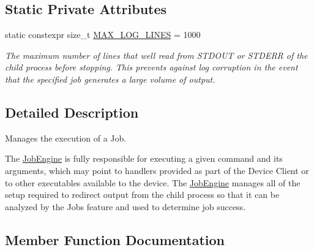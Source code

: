 \subsection*{Static Private Attributes}
\begin{DoxyCompactItemize}
\item 
\mbox{\label{class_aws_1_1_iot_1_1_device_client_1_1_jobs_1_1_job_engine_a333eb4a7c9d0ec7143e2b954ee5a1be3}} 
static constexpr size\+\_\+t \hyperlink{class_aws_1_1_iot_1_1_device_client_1_1_jobs_1_1_job_engine_a333eb4a7c9d0ec7143e2b954ee5a1be3}{M\+A\+X\+\_\+\+L\+O\+G\+\_\+\+L\+I\+N\+ES} = 1000
\begin{DoxyCompactList}\small\item\em The maximum number of lines that we\textquotesingle{}ll read from S\+T\+D\+O\+UT or S\+T\+D\+E\+RR of the child process before stopping. This prevents against log corruption in the event that the specified job generates a large volume of output. \end{DoxyCompactList}\end{DoxyCompactItemize}


\subsection{Detailed Description}
Manages the execution of a Job. 

The \hyperlink{class_aws_1_1_iot_1_1_device_client_1_1_jobs_1_1_job_engine}{Job\+Engine} is fully responsible for executing a given command and its arguments, which may point to handlers provided as part of the Device Client or to other executables available to the device. The \hyperlink{class_aws_1_1_iot_1_1_device_client_1_1_jobs_1_1_job_engine}{Job\+Engine} manages all of the setup required to redirect output from the child process so that it can be analyzed by the Jobs feature and used to determine job success. 

\subsection{Member Function Documentation}
\mbox{\label{class_aws_1_1_iot_1_1_device_client_1_1_jobs_1_1_job_engine_a51fcb47a9ed2d8c32109d47cc4cfff6d}} 
